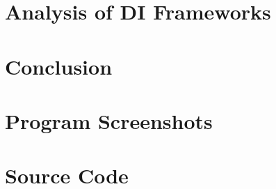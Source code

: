 \documentclass[12pt,twocolumn]{IEEEtran}
\begin{document}
\section{Analysis of DI Frameworks}


\section{Conclusion}







\clearpage
\onecolumn
\appendices
\renewcommand\thefigure{\thesection.\arabic{figure}} 
\renewcommand\theequation{\thesection.\arabic{equation}} 
\renewcommand\thetable{\thesection.\arabic{table}}
\section{Program Screenshots}
\setcounter{figure}{0}  
\setcounter{equation}{0} 
\setcounter{table}{0}


\clearpage
\section{Source Code} \label{app:code}
\setcounter{figure}{0}  
\setcounter{equation}{0} 
\setcounter{table}{0}




















	
\end{document}
